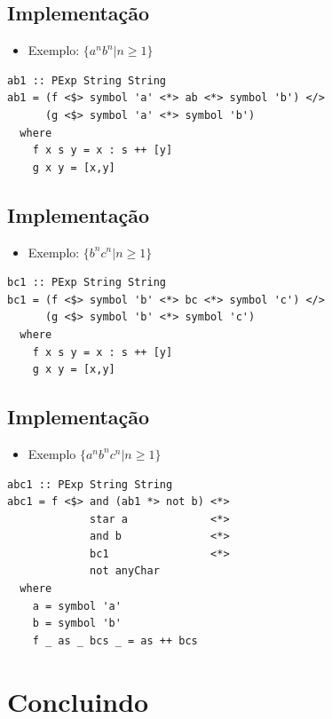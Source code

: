 \documentclass[11pt]{article}
\begin{document}
\subsection*{Implementação}
\label{sec:org16791e3}

\begin{itemize}
\item Exemplo: \(\{a^nb^n | n \geq 1\}\)
\end{itemize}

\begin{verbatim}
ab1 :: PExp String String
ab1 = (f <$> symbol 'a' <*> ab <*> symbol 'b') </>
      (g <$> symbol 'a' <*> symbol 'b')
  where
    f x s y = x : s ++ [y]
    g x y = [x,y]
\end{verbatim}
\subsection*{Implementação}
\label{sec:org20951c3}

\begin{itemize}
\item Exemplo: \(\{b^nc^n | n \geq 1\}\)
\end{itemize}

\begin{verbatim}
bc1 :: PExp String String
bc1 = (f <$> symbol 'b' <*> bc <*> symbol 'c') </>
      (g <$> symbol 'b' <*> symbol 'c')
  where
    f x s y = x : s ++ [y]
    g x y = [x,y]
\end{verbatim}
\subsection*{Implementação}
\label{sec:org9220d67}

\begin{itemize}
\item Exemplo \(\{a^nb^nc^n | n \geq 1\}\)
\end{itemize}

\begin{verbatim}
abc1 :: PExp String String
abc1 = f <$> and (ab1 *> not b) <*>
             star a             <*>
             and b              <*>
             bc1                <*>
             not anyChar
  where
    a = symbol 'a'
    b = symbol 'b'
    f _ as _ bcs _ = as ++ bcs
\end{verbatim}
\section*{Concluindo}
\label{sec:org50b68d0}
\end{document}
